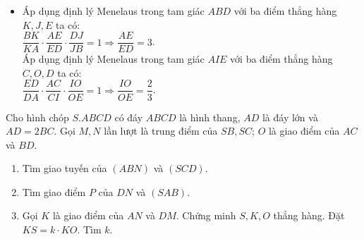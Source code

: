 \begin{bt}
\begin{bt}
{\begin{enumerate}
\begin{itemize}
				Áp dụng định lý Menelaus trong tam giác $DBC$ với ba điểm thẳng hàng $J, O, F$ ta có$\colon$\\
				$\dfrac{DJ}{JB}\cdot \dfrac{BF}{FC}\cdot \dfrac{CO}{OD}= 1 \Rightarrow \dfrac{CO}{OD}=\dfrac{3}{2}$.\\
				Vậy $\dfrac{OC}{OD}=\dfrac{3}{2}$.
				\item 	Áp dụng định lý Menelaus trong tam giác $ABD$ với ba điểm thẳng hàng $K, J, E$ ta có$\colon$\\
				$\dfrac{BK}{KA}\cdot \dfrac{AE}{ED}\cdot \dfrac{DJ}{JB}= 1 \Rightarrow \dfrac{AE}{ED}=3$.\\
				Áp dụng định lý Menelaus trong tam giác $AIE$ với ba điểm thẳng hàng $C, O, D$ ta có$\colon$\\
				$\dfrac{ED}{DA}\cdot \dfrac{AC}{CI} \cdot \dfrac{IO}{OE}= 1 \Rightarrow \dfrac{IO}{OE}=\dfrac{2}{3}$.\\
				
			\end{itemize}	
		\end{enumerate}
	}
\end{bt}
\begin{bt}%
	Cho hình chóp $S.ABCD$ có đáy $ABCD$ là hình thang, $AD$ là đáy lớn và $AD=2BC$. Gọi $M, N$ lần lượt là trung điểm của $SB, SC$; $O$ là giao điểm của $AC$ và $BD$.
	\begin{enumerate}
		\item Tìm giao tuyến của $(ABN)$ và $(SCD)$.
		\item Tìm giao điểm $P$ của $DN$ và $(SAB)$.
		\item Gọi $K$ là giao điểm của $AN$ và $DM$. Chứng minh $S, K, O$ thẳng hàng. Đặt $KS=k\cdot KO$. Tìm $k$.
	\end{enumerate}
\end{bt}
\end{bt}
